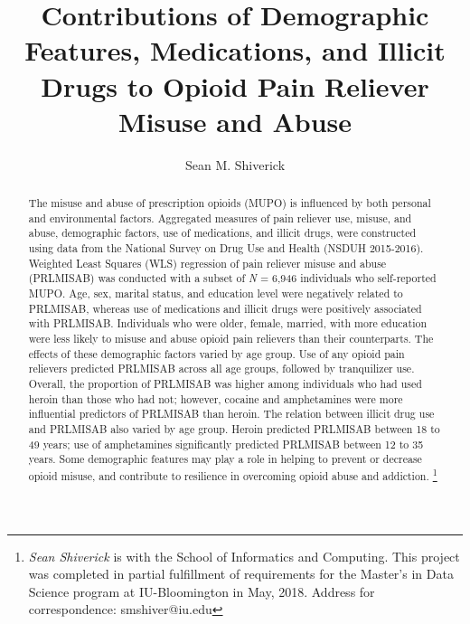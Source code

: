 \documentclass[sigconf]{acmart}
\begin{document}
\title{Contributions of Demographic Features, Medications, and Illicit Drugs 
to Opioid Pain Reliever Misuse and Abuse}
  \author{Sean M. Shiverick}

\renewcommand{\shortauthors}{S.M. Shiverick}


\begin{abstract}
  
The misuse and abuse of prescription opioids (MUPO) is influenced by both 
personal and environmental factors. Aggregated measures of pain reliever use, 
misuse, and abuse, demographic factors, use of medications, and illicit drugs, 
were constructed using data from the National Survey on Drug Use and Health 
(NSDUH 2015-2016). Weighted Least Squares (WLS) regression of pain reliever 
misuse and abuse (PRLMISAB) was conducted with a subset of \textit{N} = 6,946 
individuals who self-reported MUPO. Age, sex, marital status, and education 
level were negatively related to PRLMISAB, whereas use of medications and 
illicit drugs were positively associated with PRLMISAB. Individuals who were 
older, female, married, with more education were less likely to misuse and 
abuse opioid pain relievers than their counterparts. The effects of these 
demographic factors varied by age group. Use of any opioid pain relievers 
predicted PRLMISAB across all age groups, followed by tranquilizer use. 
Overall, the proportion of PRLMISAB was higher among individuals who had used 
heroin than those who had not; however, cocaine and amphetamines were more 
influential predictors of PRLMISAB than heroin. The relation between illicit 
drug use and PRLMISAB also varied by age group. Heroin predicted PRLMISAB 
between 18 to 49 years; use of amphetamines significantly predicted PRLMISAB 
between 12 to 35 years. Some demographic features may play a role in
helping to prevent or decrease opioid misuse, and contribute to resilience 
in overcoming opioid abuse and addiction. \footnote{\textit{Sean Shiverick} 
is with the School of Informatics and Computing. This project was completed in 
partial fulfillment of requirements for the Master's in Data Science program 
at IU-Bloomington in May, 2018. Address for correspondence: smshiver@iu.edu}

\end{abstract}

\end{document}
